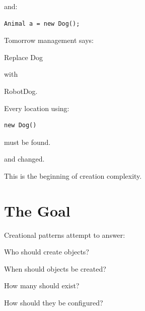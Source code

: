 \documentclass[11pt,a4paper]{book}
\begin{document}

and:

\begin{verbatim}
Animal a = new Dog();
\end{verbatim}


Tomorrow management says:


Replace Dog

with

RobotDog.


Every location using:

\begin{verbatim}
new Dog()
\end{verbatim}

must be found.


and changed.


This is the beginning of
creation complexity.


\section{The Goal}

Creational patterns attempt to answer:


Who should create objects?


When should objects be created?


How many should exist?


How should they be configured?

\end{document}
